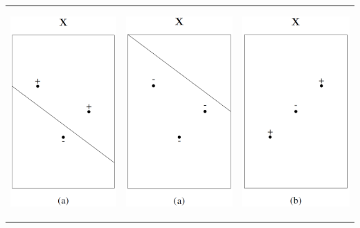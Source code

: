 \documentclass[main.tex]{subfiles}
\begin{document}
\begin{center}
    \begin{tabular}{ccc}
        \includegraphics[height=80mm]{img/VC_example2.PNG} & \includegraphics[height=80mm]{img/VC_example3.PNG} &
        \includegraphics[height=80mm]{img/VC_example4.PNG}
    \end{tabular}
\end{center}
\end{document}
